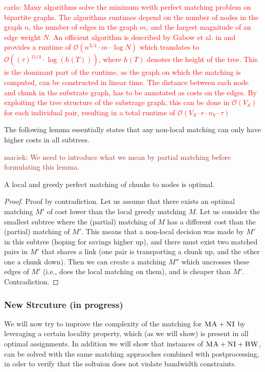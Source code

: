 \documentclass[9pt]{sigcomm-alternate}
\newcommand{\carlo}[1]{\textcolor{red}{carlo: #1}}
\newcommand{\maciek}[1]{\textcolor{brown}{maciek: #1}}
\newcommand{\MaFactor}{r}
\newcommand{\ChunkType}{\tau}
\newcommand{\SubstrateNodes}{\ensuremath{V_S}}
\newcommand{\CC}{\textsc{NI}}
\newcommand{\BW}{\textsc{BW}}
\newcommand{\MA}{\textsc{MA}}
\newcommand{\Tree}{\ensuremath{T}}
\newcommand{\Vms}{\ensuremath{n_V}}
\begin{document}
\carlo{Many algorithms solve the minimum weith perfect matching problem on 
bipartite 
graphs. The algorithms runtimes depend on  the number of nodes in the 
graph $n$, the number of edges in the graph $m$, and the largest magnitude of 
an edge weight $N$. An efficient algorithm is described by Gabow et al. in 
\cite{gabow_scaling_algorithm} and provides a runtime of $\mathcal{O}(n^{3/4} 
\cdot m \cdot \log N)$ which translates to $\mathcal{O}((\ChunkType)^{11/4} 
\cdot \log (h(\Tree)))$, where $h(T)$ denotes the height of the tree. 
This is the 
dominant part of the runtime, as the graph on which the matching 
is 
computed, can be constructed in linear time. The distance 
between each node and chunk in the substrate graph, has to be annotated as 
costs on the edges. 
By exploiting the tree structure of the substrage graph, this can be done 
in $\mathcal{O}(\SubstrateNodes)$ for each individual pair, resulting in a 
total runtime of $\mathcal{O}(\SubstrateNodes \cdot \MaFactor \cdot \Vms \cdot 
\ChunkType)$ }

The following lemma essentially states that any non-local matching can only have higher
costs in all subtrees. 

\maciek{We need to introduce what we mean by partial matching before
  formulating this lemma.}
\begin{lemma}\label{lemma:local}
A local and greedy perfect matching of chunks to nodes is optimal.
\end{lemma}
\begin{proof}
Proof by contradiction. Let us assume that there exists an optimal matching $M'$ of cost lower
than the local greedy matching $M$. 
Let us consider the smallest subtree where the (partial) matching of $M$ 
has a different cost than the (partial) matching of $M'$. 
This means 
that a non-local decision was made by $M'$ in this subtree (hoping for savings higher up),
and there must exist two matched pairs in $M'$ that shares a link (one pair is transporting a chunk up, and
 the other one a chunk down). Then we can create a matching $M''$ 
 which uncrosses these edges of $M'$ (i.e., does the local matching on them),
  and is cheaper than $M'$. Contradiction.
\end{proof}


\subsubsection{New Strcuture (in progress)}

We will now try to improve the complexity of the matching for $\MA+\CC$ by 
leveraging a certain locality property, which (as we will show) is present in 
all optimal assignments. In addition we will show that instances of 
$\MA+\CC+\BW$, can be solved with the same matching appraoches combined with 
postprocessing, in oder to verify that the soltuion does not violate bandwidth 
constraints.
\end{document}
